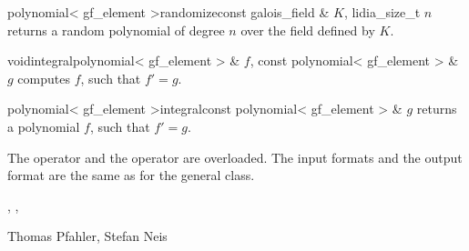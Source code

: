 
\begin{fcode}{polynomial< gf_element >}{randomize}{const galois_field & $K$, lidia_size_t $n$}
  returns a random polynomial of degree $n$ over the field defined by $K$.
\end{fcode}



\begin{fcode}{void}{integral}{polynomial< gf_element > & $f$, const polynomial< gf_element > & $g$}
  computes $f$, such that $f' = g$.
\end{fcode}

\begin{fcode}{polynomial< gf_element >}{integral}{const polynomial< gf_element > & $g$}
  returns a polynomial $f$, such that $f' = g$.
\end{fcode}



\IO

The  operator \code{>>} and the  operator \code{<<} are overloaded.
The input formats and the output format are the same as for the general class.



\SEEALSO

,
,



%



\AUTHOR

Thomas Pfahler, Stefan Neis
